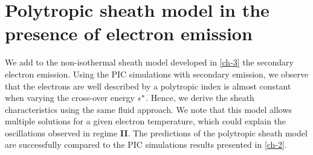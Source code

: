 



\chapter{Polytropic sheath model in the presence of electron emission}
\label{ch-4}

\begin{Chabstract}
  
We add to the non-isothermal sheath model developed in \cref{ch-3} the secondary electron emission.
Using the \ac{PIC} simulations with secondary emission, we observe that the electrons are well described by a polytropic index is almost constant when varying the cross-over energy $\epsilon^{*}$.
Hence, we derive the sheath characteristics using the same fluid approach.
We note that this model allows multiple solutions for a given electron temperature, which could explain the oscillations observed in regime {\bf II}.
The predictions of the polytropic sheath model are successfully compared to the \ac{PIC} simulations results presented in \cref{ch-2}.
\end{Chabstract}

% 
% 
% 
% 
% 

